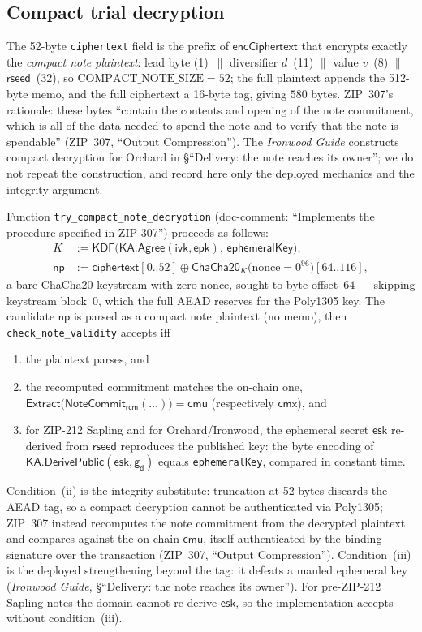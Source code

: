 \documentclass[11pt,a4paper]{article}
\theoremstyle{definition}
\newcommand{\cmx}{\mathsf{cmx}}
\newcommand{\NoteCommit}{\ensuremath{\mathsf{NoteCommit}}}
\newcommand{\Extract}{\ensuremath{\mathsf{Extract}}}
\newcommand{\ivk}{\ensuremath{\mathsf{ivk}}}
\newcommand{\gd}{\ensuremath{\mathsf{g_d}}}
\newcommand{\rcm}{\ensuremath{\mathsf{rcm}}}
\begin{document}
\subsection{Compact trial decryption}\label{sec:sync-compact-decrypt}

The 52-byte \texttt{ciphertext} field is the prefix of
$\mathsf{encCiphertext}$ that encrypts exactly the \emph{compact note
plaintext}: lead byte (1)~$\|$ diversifier $d$~(11) $\|$ value $v$~(8) $\|$
$\mathsf{rseed}$~(32), so $\mathrm{COMPACT\_NOTE\_SIZE} = 52$; the full
plaintext appends the 512-byte memo, and the full ciphertext a 16-byte tag,
giving $580$ bytes. ZIP~307's rationale: these bytes
``contain the contents and opening of the note commitment, which is all of
the data needed to spend the note and to verify that the note is spendable''
(ZIP~307, ``Output Compression''). The \emph{Ironwood Guide} constructs
compact decryption for Orchard in \S``Delivery: the note reaches its owner'';
we do not repeat the
construction, and record here only the deployed mechanics and the integrity
argument.

Function \texttt{try\_compact\_note\_decryption} (doc-comment: ``Implements
the procedure specified in ZIP 307'') proceeds as follows:
\begin{align*}
K &:= \mathsf{KDF}\bigl(\mathsf{KA.Agree}(\ivk, \mathsf{epk}),\,
      \mathsf{ephemeralKey}\bigr),\\
\mathsf{np} &:= \mathsf{ciphertext}[0..52] \oplus
      \mathsf{ChaCha20}_{K}\bigl(\mathrm{nonce} = 0^{96}\bigr)[64..116],
\end{align*}
a bare ChaCha20 keystream with zero nonce, sought to byte offset~$64$ ---
skipping keystream block~0, which the full AEAD reserves for the Poly1305
key. The candidate $\mathsf{np}$ is
parsed as a compact note plaintext (no memo), then
\texttt{check\_note\_validity} accepts iff
\begin{enumerate}[label=(\roman*)]
\item the plaintext parses, and
\item the recomputed commitment matches the on-chain one,
  $\Extract\bigl(\NoteCommit_{\rcm}(\ldots)\bigr) = \mathsf{cmu}$
  (respectively $\cmx$), and
\item for ZIP-212 Sapling and for Orchard/Ironwood, the ephemeral secret
$\mathsf{esk}$ re-derived from
  $\mathsf{rseed}$ reproduces the published key: the byte encoding of
  $\mathsf{KA.DerivePublic}(\mathsf{esk}, \gd)$ equals
  \texttt{ephemeralKey}, compared in constant time.
\end{enumerate}
Condition~(ii) is the integrity
substitute: truncation at 52 bytes discards the AEAD tag, so a compact
decryption cannot be authenticated via Poly1305; ZIP~307 instead recomputes
the note commitment from the decrypted plaintext and compares against the
on-chain $\mathsf{cmu}$, itself authenticated by the binding signature over
the transaction (ZIP~307, ``Output Compression''). Condition~(iii) is the
deployed strengthening beyond the tag: it defeats a mauled ephemeral key
(\emph{Ironwood Guide}, \S``Delivery: the note reaches its owner'').
For pre-ZIP-212 Sapling notes the domain cannot re-derive
$\mathsf{esk}$, so the implementation accepts without condition~(iii).
\end{document}
